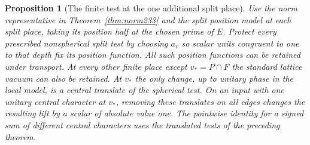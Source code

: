 \documentclass[a4paper,11pt]{article}
\newtheorem{proposition}{Proposition}[section]
\theoremstyle{definition}
\theoremstyle{remark}
\numberwithin{equation}{section}
\begin{document}
\begin{proposition}[The finite test at the one additional split place]
\label{prop:split233}
Use the norm representative in Theorem~\ref{thm:norm233} and the
split position model at each split place, taking its position half
at the chosen prime of \(E\). Protect every prescribed nonspherical
split test by choosing \(a_v\) so scalar units congruent to one to
that depth fix its position function. All such position functions
can be retained under transport. At every other finite place except
\(v_*=P\cap F\) the standard lattice vacuum can also be retained.
At \(v_*\) the only change, up to unitary phase in the local model,
is a central translate of the spherical test. On an input with
one unitary central character at \(v_*\), removing these translates
on all edges changes the resulting lift by a scalar of absolute
value one. The pointwise identity for a signed sum of different
central characters uses the translated tests of the preceding theorem.
\end{proposition}
\end{document}
